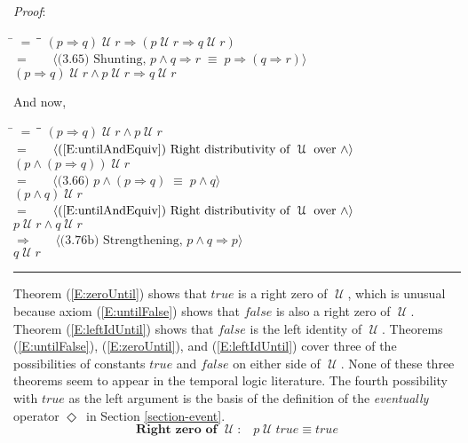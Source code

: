 \documentclass[12pt, fleqn, leqno]{article}
\newcommand{\lgap}{2pt}                             %
\newcommand{\mymathindent}{24pt}                    %
\newcommand{\equivs}{\ensuremath{\;\equiv\;}}       %
\newcommand{\impl}{\ensuremath{\Rightarrow}}        %
\newcommand{\Until}{\;\mathcal{U}\;}
\newcommand{\Event}{\Diamond\,}
\newcommand{\myqed}{\rule[-.23ex]{1.2ex}{2.0ex}}
\newcommand{\myqedtab}{\hspace{384pt}}              %
\newcommand{\Gll} {\langle}                         %
\newcommand{\Ggg} {\rangle}                         %
\newcommand{\Hint}[1]     {\ \ \ $\Gll              \mbox{#1} \Ggg$ }   %
\begin{document}
\emph{Proof}:
\begin{tabbing}
\hspace{\mymathindent} \= $= \;$ \= \myqedtab \= \kill
  \> \>   $(p \impl q) \Until r\impl (p \Until r \impl q \Until r)$\\[\lgap]
  \> $=$  \>  \Hint{(3.65) Shunting, $p\land q\impl r\equivs p\impl (q\impl r)$}\\[\lgap]
  \> \>   $(p \impl q) \Until r\land p \Until r \impl q \Until r$
\end{tabbing}
And now,
\begin{tabbing}
\hspace{\mymathindent} \= $= \;$ \= \myqedtab \= \kill
  \> \>   $(p \impl q) \Until r\land p \Until r$\\[\lgap]
  \> $=$ \> \Hint{(\ref{E:untilAndEquiv}) Right distributivity of $\Until$ over $\land$} \\[\lgap]
  \> \>   $(p\land (p\impl q)) \Until r$\\[\lgap]
  \> $=$  \>  \Hint{(3.66) $p\land (p \impl q) \equivs p \land q$}\\[\lgap]
  \> \>   $(p\land q) \Until r$\\[\lgap]
  \> $=$ \> \Hint{(\ref{E:untilAndEquiv}) Right distributivity of $\Until$ over $\land$} \\[\lgap]
  \> \>   $p\Until r\land q\Until r$\\[\lgap]
  \> $\impl$ \> \Hint{(3.76b) Strengthening, $p\land q \impl p$} \\[\lgap]
  \> \>   $q\Until r$ \quad \myqed
\end{tabbing}

Theorem (\ref{E:zeroUntil}) shows that $true$ is a right zero of $\Until$, which is unusual because
axiom (\ref{E:untilFalse}) shows that $false$ is also a right zero of $\Until$.
Theorem (\ref{E:leftIdUntil}) shows that $false$ is the left identity of $\Until$.
Theorems (\ref{E:untilFalse}), (\ref{E:zeroUntil}), and (\ref{E:leftIdUntil}) cover three of the
possibilities of constants $true$ and $false$ on either side of $\Until$.
None of these three theorems seem to appear in the temporal logic literature.
The fourth possibility with $true$ as the left argument is the basis of the definition of the \textit{eventually}
operator $\Event$ in Section \ref{section-event}.
\begin{equation}\label{E:zeroUntil}
\textbf{Right zero of $\Until$:}\quad p \Until true \equiv true
\end{equation}
\end{document}
